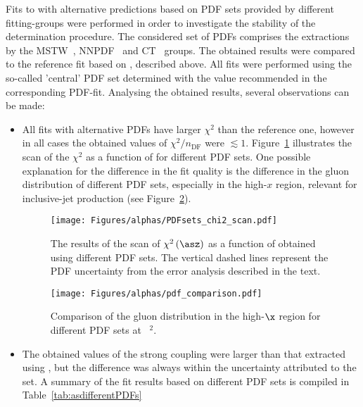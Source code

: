 Fits to \asz with alternative predictions based on PDF sets provided by different fitting-groups were performed in order to investigate the stability of the \asz determination procedure. The considered set of PDFs comprises the extractions by the MSTW~\cite{Martin:2009iq}, NNPDF~\cite{Ball:2012cx} and CT~\cite{Gao:2013xoa} groups. The obtained results were compared to the reference fit based on , described above. All fits were performed using the so-called 'central' PDF set determined with the \asz value recommended in the corresponding PDF-fit. Analysing the obtained results, several observations can be made:
\begin{itemize}
 \item All fits with alternative PDFs have larger $\chi^2$ than the reference one, however in all cases the obtained values of $\chi^2/n_\text{DF}$ were $\lesssim 1$. Figure~\ref{fig:chi2scanpdf} illustrates the scan of the $\chi^2$ as a function of \asz for different PDF sets. One possible explanation for the difference in the fit quality is the difference in the gluon distribution of different PDF sets, especially in the high-$x$ region, relevant for inclusive-jet production (see Figure~\ref{fig:pdf_gluon_comp}).
\begin{figure}[t]
 \centering
 \texttt{[image: Figures/alphas/PDFsets\_chi2\_scan.pdf]}
 \caption{The results of the scan of $\chi^2\left(\asz\right)$ as a function of \asz obtained using different PDF sets. The vertical dashed lines represent the PDF uncertainty from the  error analysis described in the text.}
 \label{fig:chi2scanpdf}
\end{figure}
\begin{figure}[ht]
 \centering
 \texttt{[image: Figures/alphas/pdf\_comparison.pdf]}
 \caption{Comparison of the gluon distribution in the high-$\x$ region for different PDF sets at ~\GeV$^2$.}
 \label{fig:pdf_gluon_comp}
\end{figure}
 \item The obtained values of the strong coupling were larger than that extracted using , but the difference was always within the uncertainty attributed to the  set. A summary of the fit results based on different PDF sets is compiled in Table~\ref{tab:asdifferentPDFs}
\end{itemize}

